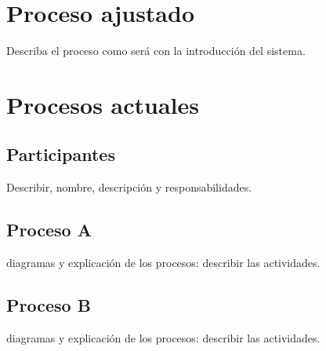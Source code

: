 \section{Proceso ajustado}


Describa el proceso como será con la introducción del sistema.

\section{Procesos actuales}

\subsection{Participantes}

Describir, nombre, descripción y responsabilidades.

\subsection{Proceso A}

diagramas y explicación de los procesos: describir las actividades.

\subsection{Proceso B}

diagramas y explicación de los procesos: describir las actividades.
